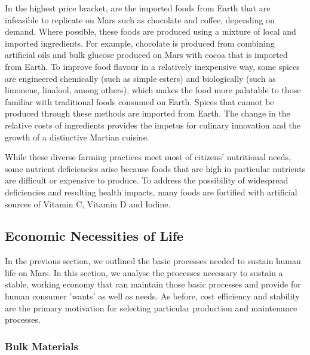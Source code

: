 \documentclass[fleqn,10pt]{Stylesheet} %
\begin{document}
In the highest price bracket, are the imported foods from Earth that are infeasible to replicate on Mars such as chocolate and coffee, depending on demand. Where possible, these foods are produced using a mixture of local and imported ingredients. For example, chocolate is produced from combining artificial oils and bulk glucose produced on Mars with cocoa that is imported from Earth. To improve food flavour in a relatively inexpensive way, some spices are engineered chemically (such as simple esters) and biologically (such as limonene, linalool, among others), which makes the food more palatable to those familiar with traditional foods consumed on Earth. Spices that cannot be produced through these methods are imported from Earth. The change in the relative costs of ingredients provides the impetus for culinary innovation and the growth of a distinctive Martian cuisine.

While these diverse farming practices meet most of citizens' nutritional needs, some nutrient deficiencies arise because foods that are high in particular nutrients are difficult or expensive to produce. To address the possibility of widespread deficiencies and resulting health impacts, many foods are fortified with artificial sources of Vitamin C, Vitamin D and Iodine.


\subsection{Economic Necessities of Life}

In the previous section, we outlined the basic processes needed to sustain human life on Mars. In this section, we analyse the processes necessary to sustain a stable, working economy that can maintain those basic processes and provide for human consumer 'wants' as well as needs. As before, cost efficiency and stability are the primary motivation for selecting particular production and maintenance processes. 


\subsubsection{Bulk Materials}
\label{sec:necessities_bulk}
\end{document}
